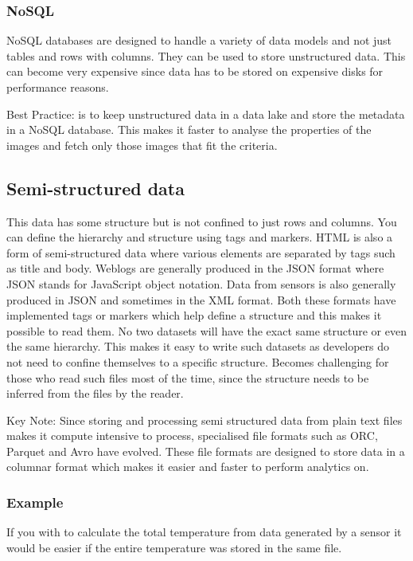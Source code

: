 \subsubsection{NoSQL}
NoSQL databases are designed to handle a variety of data models and not just tables and rows with columns.
They can be used to store unstructured data.
This can become very expensive since data has to be stored on expensive disks for performance reasons.

\begin{note}
    Best Practice: is to keep unstructured data in a data lake and store the metadata in a NoSQL database.
    This makes it faster to analyse the properties of the images and fetch only those images that fit the criteria.
\end{note}

\subsection{Semi-structured data}
This data has some structure but is not confined to just rows and columns.
You can define the hierarchy and structure using tags and markers.
HTML is also a form of semi-structured data where various elements are separated by tags such as title and body.
Weblogs are generally produced in the JSON format where JSON stands for JavaScript object notation.
Data from sensors is also generally produced in JSON and sometimes in the XML format.
Both these formats have implemented tags or markers which help define a structure and this makes it possible to read them.
No two datasets will have the exact same structure or even the same hierarchy.
This makes it easy to write such datasets as developers do not need to confine themselves to a specific structure.
Becomes challenging for those who read such files most of the time, since the structure needs to be inferred from the files by the reader.

\begin{note}
    Key Note: Since storing and processing semi structured data from plain text files makes it compute intensive to process, specialised file formats such as ORC, Parquet and Avro have evolved.
    These file formats are designed to store data in a columnar format which makes it easier and faster to perform analytics on.
\end{note}

\subsubsection{Example}
If you with to calculate the total temperature from data generated by a sensor it would be easier if the entire temperature was stored in the same file.

